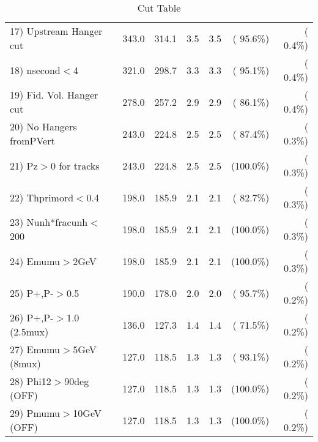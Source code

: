 \begin{table}[h!]
\begin{tabular}{||l||r|r|r|r|r|r||}
 17) Upstream Hanger cut  &        343.0 &        314.1 &          3.5 &          3.5 & ( 95.6\%) & (  0.4\%) \\
 18) nsecond$<$4          &        321.0 &        298.7 &          3.3 &          3.3 & ( 95.1\%) & (  0.4\%) \\
 19) Fid. Vol. Hanger cut &        278.0 &        257.2 &          2.9 &          2.9 & ( 86.1\%) & (  0.4\%) \\
 20) No Hangers fromPVert &        243.0 &        224.8 &          2.5 &          2.5 & ( 87.4\%) & (  0.3\%) \\
 21) Pz$>$0 for tracks    &        243.0 &        224.8 &          2.5 &          2.5 & (100.0\%) & (  0.3\%) \\
 22) Thprimord$<$0.4      &        198.0 &        185.9 &          2.1 &          2.1 & ( 82.7\%) & (  0.3\%) \\
 23) Nunh*fracunh$<$200   &        198.0 &        185.9 &          2.1 &          2.1 & (100.0\%) & (  0.3\%) \\
 24) Emumu$>$2GeV         &        198.0 &        185.9 &          2.1 &          2.1 & (100.0\%) & (  0.3\%) \\
 25) P+,P-$>$0.5          &        190.0 &        178.0 &          2.0 &          2.0 & ( 95.7\%) & (  0.2\%) \\
 26) P+,P-$>$1.0 (2.5mux) &        136.0 &        127.3 &          1.4 &          1.4 & ( 71.5\%) & (  0.2\%) \\
 27) Emumu$>$5GeV  (8mux) &        127.0 &        118.5 &          1.3 &          1.3 & ( 93.1\%) & (  0.2\%) \\
 28) Phi12$>$90deg  (OFF) &        127.0 &        118.5 &          1.3 &          1.3 & (100.0\%) & (  0.2\%) \\
 29) Pmumu$>$10GeV  (OFF) &        127.0 &        118.5 &          1.3 &          1.3 & (100.0\%) & (  0.2\%) \\
 \hline
 \hline
 \end{tabular}
 \caption{Cut Table           }
 \label{tab-cutcohjpsi-mumu_anuecc}
 \end{table}
